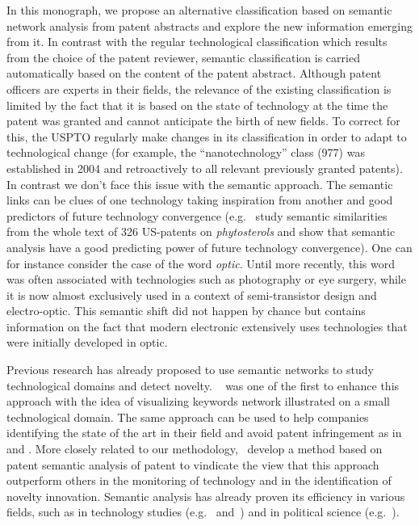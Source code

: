 In this monograph, we propose an alternative classification based on semantic network analysis from patent abstracts and explore the new information emerging from it. In contrast with the regular technological classification which results from the choice of the patent reviewer, semantic classification is carried automatically based on the content of the patent abstract. Although patent officers are experts in their fields, the relevance of the existing classification is limited by the fact that it is based on the state of technology at the time the patent was granted and cannot anticipate the birth of new fields. To correct for this, the USPTO regularly make changes in its classification in order to adapt to technological change (for example, the ``nanotechnology'' class (977) was established in 2004 and retroactively to all relevant previously granted patents). In contrast we don't face this issue with the semantic approach. The semantic links can be clues of one technology taking inspiration from another and  good predictors of future technology convergence (e.g.~\cite{preschitschek2013} study semantic similarities from the whole text of 326 US-patents on \textit{phytosterols} and show that semantic analysis have a good predicting power of future technology convergence). One can for instance consider the case of the word \textit{optic}. Until more recently, this word was often associated with technologies such as photography or eye surgery, while it is now almost exclusively used in a context of semi-transistor design and electro-optic. This semantic shift did not happen by chance but contains information on the fact that modern electronic extensively uses technologies that were initially developed in optic. 

Previous research has already proposed to use semantic networks to study technological domains and detect novelty. ~\cite{yoon2004text} was one of the first to enhance this approach with the idea of visualizing keywords network illustrated on a small technological domain. The same approach can be used to help companies identifying the state of the art in their field and avoid patent infringement as in \cite{park2014semantic} and \cite{yoon2011detecting}. More closely related to our methodology,~\cite{gerken2012new} develop a method based on patent semantic analysis of patent to vindicate the view that this approach outperform others in the monitoring of technology and in the identification of novelty innovation. Semantic analysis has already proven its efficiency in various fields, such as in technology studies (e.g.~\cite{choi2014patent} and~\cite{fattori2003text}) and in political science (e.g.~\cite{2015arXiv151003797G}).


